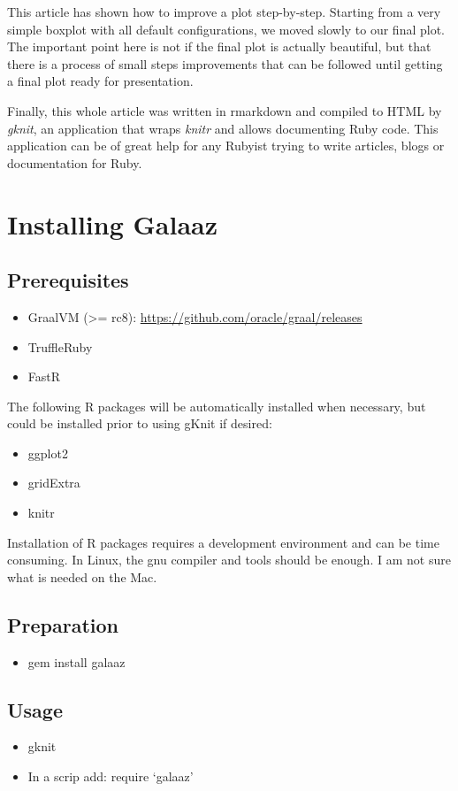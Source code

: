 \documentclass[11pt,]{article}
\providecommand{\tightlist}{%
  \setlength{\itemsep}{0pt}\setlength{\parskip}{0pt}}
\begin{document}
This article has shown how to improve a plot step-by-step. Starting from
a very simple boxplot with all default configurations, we moved slowly
to our final plot. The important point here is not if the final plot is
actually beautiful, but that there is a process of small steps
improvements that can be followed until getting a final plot ready for
presentation.

Finally, this whole article was written in rmarkdown and compiled to
HTML by \emph{gknit}, an application that wraps \emph{knitr} and allows
documenting Ruby code. This application can be of great help for any
Rubyist trying to write articles, blogs or documentation for Ruby.

\section{Installing Galaaz}\label{installing-galaaz}

\subsection{Prerequisites}\label{prerequisites}

\begin{itemize}
\tightlist
\item
  GraalVM (\textgreater{}= rc8):
  \url{https://github.com/oracle/graal/releases}
\item
  TruffleRuby
\item
  FastR
\end{itemize}

The following R packages will be automatically installed when necessary,
but could be installed prior to using gKnit if desired:

\begin{itemize}
\tightlist
\item
  ggplot2
\item
  gridExtra
\item
  knitr
\end{itemize}

Installation of R packages requires a development environment and can be
time consuming. In Linux, the gnu compiler and tools should be enough. I
am not sure what is needed on the Mac.

\subsection{Preparation}\label{preparation}

\begin{itemize}
\tightlist
\item
  gem install galaaz
\end{itemize}

\subsection{Usage}\label{usage}

\begin{itemize}
\tightlist
\item
  gknit 
\item
  In a scrip add: require `galaaz'
\end{itemize}
\end{document}
